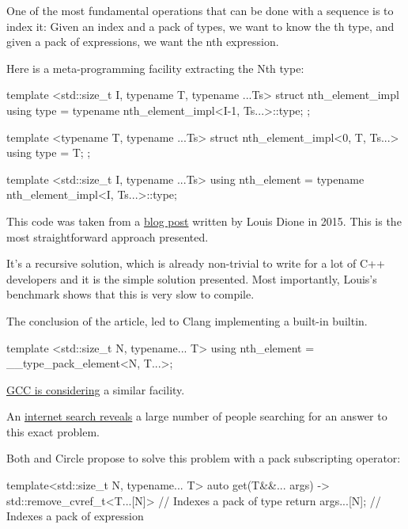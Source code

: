 \documentclass{wg21}
\begin{document}
One of the most fundamental operations that can be done with a sequence is to index it:
Given an index  and a pack of types, we want to know the th type, and given a pack of expressions, we want the nth expression.

Here is a meta-programming facility extracting the Nth type:

\begin{colorblock}
template <std::size_t I, typename T, typename ...Ts>
struct nth_element_impl {
    using type = typename nth_element_impl<I-1, Ts...>::type;
};

template <typename T, typename ...Ts>
struct nth_element_impl<0, T, Ts...> {
    using type = T;
};

template <std::size_t I, typename ...Ts>
using nth_element = typename nth_element_impl<I, Ts...>::type;
\end{colorblock}

This code was taken from a \href{https://ldionne.com/2015/11/29/efficient-parameter-pack-indexing/}{blog post} written by Louis Dione in 2015.
This is the most straightforward approach presented.

It's a recursive solution, which is already non-trivial to write for a lot of C++ developers and it is the simple solution presented.
Most importantly, Louis's benchmark shows that this is very slow to compile.

The conclusion of the article, led to Clang implementing a built-in  builtin.

\begin{colorblock}
template <std::size_t N, typename... T>
using nth_element = __type_pack_element<N, T...>;
\end{colorblock}

\href{https://gcc.gnu.org/bugzilla/show_bug.cgi?id=100157}{GCC is considering} a similar facility.

An \href{https://gcc.gnu.org/bugzilla/show_bug.cgi?id=100157}{internet search reveals} a large number of people searching for an answer to this exact problem.

Both  and Circle propose to solve this problem with a pack subscripting operator:

\begin{colorblock}
template<std::size_t N, typename... T>
auto get(T&&... args) -> std::remove_cvref_t<T...[N]> // Indexes a pack of type {
    return args...[N]; // Indexes a pack of expression
}
\end{colorblock}
\end{document}
